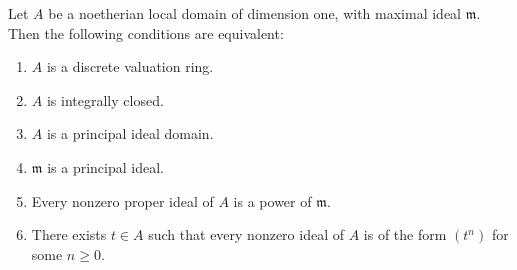 Let $A$ be a noetherian local domain of dimension one, with maximal ideal $\mathfrak{m}$. Then the following conditions are equivalent:

\begin{enumerate}
  \item[(i)] $A$ is a discrete valuation ring.
  \item[(ii)] $A$ is integrally closed.
  \item[(iii)] $A$ is a principal ideal domain.
  \item[(iv)] $\mathfrak{m}$ is a principal ideal.
  \item[(v)] Every nonzero proper ideal of $A$ is a power of $\mathfrak{m}$.
  \item[(vi)] There exists $t \in A$ such that every nonzero ideal of $A$ is of the form $(t^n)$ for some $n \geq 0$.
\end{enumerate}

